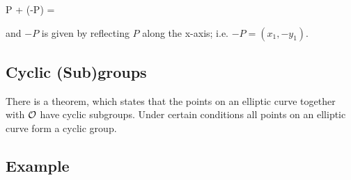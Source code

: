 \bee
P + (-P) = \Oc
\eee

and $-P$ is given by reflecting $P$ along the x-axis; i.e. $-P = (x_1, -y_1)$.

\subsection{Cyclic (Sub)groups}

There is a theorem, which states that the points on an elliptic curve together with $\mathcal{O}$ have cyclic subgroups. Under certain conditions all points on an elliptic curve form a cyclic group.

\subsection{Example}
